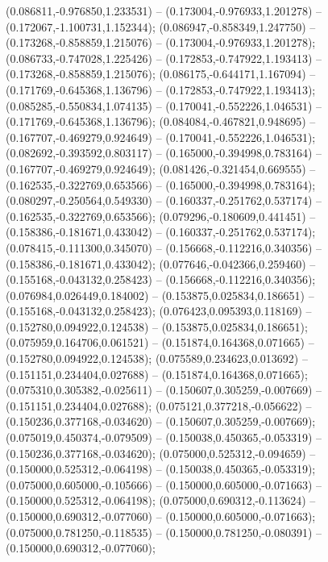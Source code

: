  (0.086811,-0.976850,1.233531) -- (0.173004,-0.976933,1.201278) -- (0.172067,-1.100731,1.152344);
 (0.086947,-0.858349,1.247750) -- (0.173268,-0.858859,1.215076) -- (0.173004,-0.976933,1.201278);
 (0.086733,-0.747028,1.225426) -- (0.172853,-0.747922,1.193413) -- (0.173268,-0.858859,1.215076);
 (0.086175,-0.644171,1.167094) -- (0.171769,-0.645368,1.136796) -- (0.172853,-0.747922,1.193413);
 (0.085285,-0.550834,1.074135) -- (0.170041,-0.552226,1.046531) -- (0.171769,-0.645368,1.136796);
 (0.084084,-0.467821,0.948695) -- (0.167707,-0.469279,0.924649) -- (0.170041,-0.552226,1.046531);
 (0.082692,-0.393592,0.803117) -- (0.165000,-0.394998,0.783164) -- (0.167707,-0.469279,0.924649);
 (0.081426,-0.321454,0.669555) -- (0.162535,-0.322769,0.653566) -- (0.165000,-0.394998,0.783164);
 (0.080297,-0.250564,0.549330) -- (0.160337,-0.251762,0.537174) -- (0.162535,-0.322769,0.653566);
 (0.079296,-0.180609,0.441451) -- (0.158386,-0.181671,0.433042) -- (0.160337,-0.251762,0.537174);
 (0.078415,-0.111300,0.345070) -- (0.156668,-0.112216,0.340356) -- (0.158386,-0.181671,0.433042);
 (0.077646,-0.042366,0.259460) -- (0.155168,-0.043132,0.258423) -- (0.156668,-0.112216,0.340356);
 (0.076984,0.026449,0.184002) -- (0.153875,0.025834,0.186651) -- (0.155168,-0.043132,0.258423);
 (0.076423,0.095393,0.118169) -- (0.152780,0.094922,0.124538) -- (0.153875,0.025834,0.186651);
 (0.075959,0.164706,0.061521) -- (0.151874,0.164368,0.071665) -- (0.152780,0.094922,0.124538);
 (0.075589,0.234623,0.013692) -- (0.151151,0.234404,0.027688) -- (0.151874,0.164368,0.071665);
 (0.075310,0.305382,-0.025611) -- (0.150607,0.305259,-0.007669) -- (0.151151,0.234404,0.027688);
 (0.075121,0.377218,-0.056622) -- (0.150236,0.377168,-0.034620) -- (0.150607,0.305259,-0.007669);
 (0.075019,0.450374,-0.079509) -- (0.150038,0.450365,-0.053319) -- (0.150236,0.377168,-0.034620);
 (0.075000,0.525312,-0.094659) -- (0.150000,0.525312,-0.064198) -- (0.150038,0.450365,-0.053319);
 (0.075000,0.605000,-0.105666) -- (0.150000,0.605000,-0.071663) -- (0.150000,0.525312,-0.064198);
 (0.075000,0.690312,-0.113624) -- (0.150000,0.690312,-0.077060) -- (0.150000,0.605000,-0.071663);
 (0.075000,0.781250,-0.118535) -- (0.150000,0.781250,-0.080391) -- (0.150000,0.690312,-0.077060);
